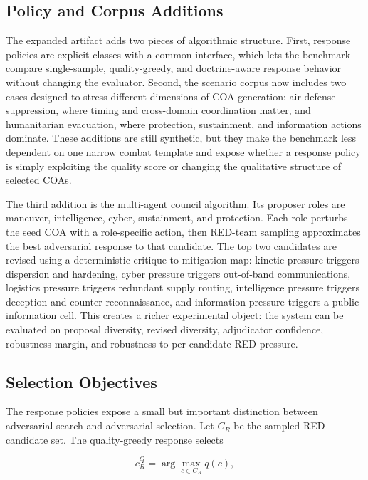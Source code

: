 \documentclass[letterpaper]{article}
\begin{document}
\subsection{Policy and Corpus Additions}

The expanded artifact adds two pieces of algorithmic structure. First, response policies are explicit classes with a common interface, which lets the benchmark compare single-sample, quality-greedy, and doctrine-aware response behavior without changing the evaluator. Second, the scenario corpus now includes two cases designed to stress different dimensions of COA generation: air-defense suppression, where timing and cross-domain coordination matter, and humanitarian evacuation, where protection, sustainment, and information actions dominate. These additions are still synthetic, but they make the benchmark less dependent on one narrow combat template and expose whether a response policy is simply exploiting the quality score or changing the qualitative structure of selected COAs.

The third addition is the multi-agent council algorithm. Its proposer roles are maneuver, intelligence, cyber, sustainment, and protection. Each role perturbs the seed COA with a role-specific action, then RED-team sampling approximates the best adversarial response to that candidate. The top two candidates are revised using a deterministic critique-to-mitigation map: kinetic pressure triggers dispersion and hardening, cyber pressure triggers out-of-band communications, logistics pressure triggers redundant supply routing, intelligence pressure triggers deception and counter-reconnaissance, and information pressure triggers a public-information cell. This creates a richer experimental object: the system can be evaluated on proposal diversity, revised diversity, adjudicator confidence, robustness margin, and robustness to per-candidate RED pressure.

\subsection{Selection Objectives}

The response policies expose a small but important distinction between adversarial search and adversarial selection. Let $C_R$ be the sampled RED candidate set. The quality-greedy response selects

\begin{equation}
c_R^Q = \arg\max_{c \in C_R} q(c),
\end{equation}
\end{document}
